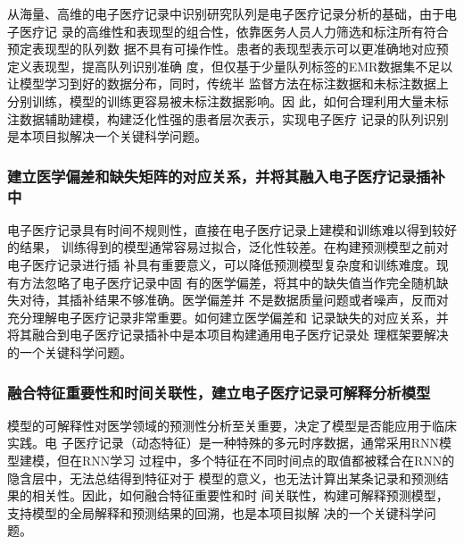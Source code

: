 从海量、高维的电子医疗记录中识别研究队列是电子医疗记录分析的基础，由于电子医疗记
录的高维性和表现型的组合性，依靠医务人员人力筛选和标注所有符合预定表现型的队列数
据不具有可操作性。患者的表现型表示可以更准确地对应预定义表现型，提高队列识别准确
度，但仅基于少量队列标签的EMR数据集不足以让模型学习到好的数据分布，同时，传统半
监督方法在标注数据和未标注数据上分别训练，模型的训练更容易被未标注数据影响。因
此，如何合理利用大量未标注数据辅助建模，构建泛化性强的患者层次表示，实现电子医疗
记录的队列识别是本项目拟解决一个关键科学问题。

\subsubsection{建立医学偏差和缺失矩阵的对应关系，并将其融入电子医疗记录插补中}

电子医疗记录具有时间不规则性，直接在电子医疗记录上建模和训练难以得到较好的结果，
训练得到的模型通常容易过拟合，泛化性较差。在构建预测模型之前对电子医疗记录进行插
补具有重要意义，可以降低预测模型复杂度和训练难度。现有方法忽略了电子医疗记录中固
有的医学偏差，将其中的缺失值当作完全随机缺失对待，其插补结果不够准确。医学偏差并
不是数据质量问题或者噪声，反而对充分理解电子医疗记录非常重要。如何建立医学偏差和
记录缺失的对应关系，并将其融合到电子医疗记录插补中是本项目构建通用电子医疗记录处
理框架要解决的一个关键科学问题。

\subsubsection{融合特征重要性和时间关联性，建立电子医疗记录可解释分析模型}

模型的可解释性对医学领域的预测性分析至关重要，决定了模型是否能应用于临床实践。电
子医疗记录（动态特征）是一种特殊的多元时序数据，通常采用RNN模型建模，但在RNN学习
过程中，多个特征在不同时间点的取值都被糅合在RNN的隐含层中，无法总结得到特征对于
模型的意义，也无法计算出某条记录和预测结果的相关性。因此，如何融合特征重要性和时
间关联性，构建可解释预测模型，支持模型的全局解释和预测结果的回溯，也是本项目拟解
决的一个关键科学问题。